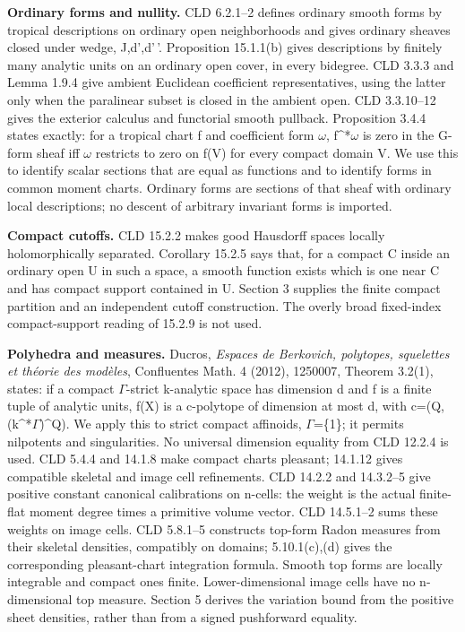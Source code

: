\documentclass[
  10pt,
]{article}
\begin{document}
\textbf{Ordinary forms and nullity.} CLD 6.2.1--2 defines ordinary
smooth forms by tropical descriptions on ordinary open neighborhoods and
gives ordinary sheaves closed under wedge, J,d',d'\,'. Proposition
15.1.1(b) gives descriptions by finitely many analytic units on an
ordinary open cover, in every bidegree. CLD 3.3.3 and Lemma 1.9.4 give
ambient Euclidean coefficient representatives, using the latter only
when the paralinear subset is closed in the ambient open. CLD 3.3.10--12
gives the exterior calculus and functorial smooth pullback. Proposition
3.4.4 states exactly: for a tropical chart f and coefficient form \ensuremath{\omega},
f\^{}*\ensuremath{\omega} is zero in the G-form sheaf iff \ensuremath{\omega} restricts to zero on f(V) for
every compact domain V. We use this to identify scalar sections that are
equal as functions and to identify forms in common moment charts.
Ordinary forms are sections of that sheaf with ordinary local
descriptions; no descent of arbitrary invariant forms is imported.

\textbf{Compact cutoffs.} CLD 15.2.2 makes good Hausdorff spaces locally
holomorphically separated. Corollary 15.2.5 says that, for a compact C
inside an ordinary open U in such a space, a smooth function exists
which is one near C and has compact support contained in U. Section 3
supplies the finite compact partition and an independent cutoff
construction. The overly broad fixed-index compact-support reading of
15.2.9 is not used.

\textbf{Polyhedra and measures.} Ducros, \emph{Espaces de Berkovich,
polytopes, squelettes et théorie des modèles}, Confluentes Math. 4
(2012), 1250007, Theorem 3.2(1), states: if a compact \ensuremath{\Gamma}-strict
k-analytic space has dimension d and f is a finite tuple of analytic
units, \textbar f\textbar(X) is a c-polytope of dimension at most d,
with c=(Q,(\textbar k\^{}*\textbar \ensuremath{\Gamma})\^{}Q). We apply this to strict
compact affinoids, \ensuremath{\Gamma}=\{1\}; it permits nilpotents and singularities. No
universal dimension equality from CLD 12.2.4 is used. CLD 5.4.4 and
14.1.8 make compact charts pleasant; 14.1.12 gives compatible skeletal
and image cell refinements. CLD 14.2.2 and 14.3.2--5 give positive
constant canonical calibrations on n-cells: the weight is the actual
finite-flat moment degree times a primitive volume vector. CLD 14.5.1--2
sums these weights on image cells. CLD 5.8.1--5 constructs top-form
Radon measures from their skeletal densities, compatibly on domains;
5.10.1(c),(d) gives the corresponding pleasant-chart integration
formula. Smooth top forms are locally integrable and compact ones
finite. Lower-dimensional image cells have no n-dimensional top measure.
Section 5 derives the variation bound from the positive sheet densities,
rather than from a signed pushforward equality.
\end{document}
